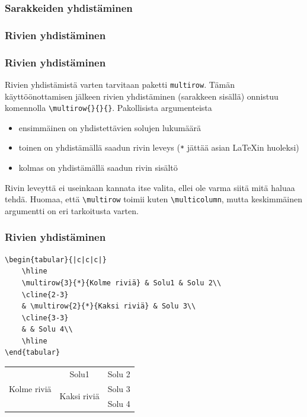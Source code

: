 \begin{frame}[fragile]
    \frametitle{Sarakkeiden yhdistäminen}

    

\end{frame}
\subsubsection{Rivien yhdistäminen}
\begin{frame}[fragile]
    \frametitle{Rivien yhdistäminen}
    Rivien yhdistämistä varten tarvitaan paketti \verb-multirow-. Tämän käyttöönottamisen jälkeen rivien yhdistäminen (sarakkeen sisällä) onnistuu komennolla \verb-\multirow{}{}{}-. Pakollisista argumenteista
    \begin{itemize}
        \item ensimmäinen on yhdistettävien solujen lukumäärä
        \item toinen on yhdistämällä saadun rivin leveys (\verb-*- jättää asian \LaTeX in huoleksi)
        \item kolmas on yhdistämällä saadun rivin sisältö
    \end{itemize}
    Rivin leveyttä ei useinkaan kannata itse valita, ellei ole varma siitä mitä haluaa tehdä. 
    \vaihto
    Huomaa, että \verb-\multirow- toimii kuten \verb-\multicolumn-, mutta keskimmäinen argumentti on eri tarkoitusta varten.
\end{frame}
\begin{frame}[fragile]
    \frametitle{Rivien yhdistäminen} 
    \begin{scriptsize}
        \begin{Verbatim}[frame=single]
\begin{tabular}{|c|c|c|}
    \hline
    \multirow{3}{*}{Kolme riviä} & Solu1 & Solu 2\\
    \cline{2-3}
    & \multirow{2}{*}{Kaksi riviä} & Solu 3\\
    \cline{3-3}
    & & Solu 4\\
    \hline
\end{tabular}
        \end{Verbatim}
    \end{scriptsize}
    \begin{serif}
        \begin{tabular}{|c|c|c|}
            \hline
            \multirow{3}{*}{Kolme riviä} & Solu1	& Solu 2\\\cline{2-3}
                                          & \multirow{2}{*}{Kaksi riviä}	& Solu 3\\\cline{3-3}
                                          & & Solu 4\\
            \hline
        \end{tabular}
    \end{serif}
\end{frame}

